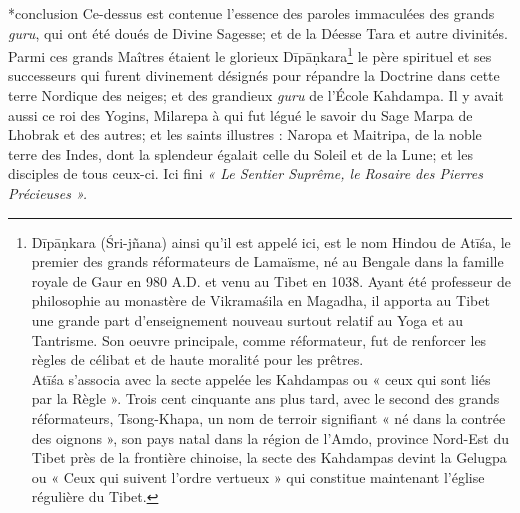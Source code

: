 \documentclass[10pt]{book}
\makeatletter
\renewcommand{\section}{\@startsection{section}{0}{0mm}
   {\baselineskip}
   {\baselineskip}{\normalfont\normalsize\scshape\centering}
}
\makeatother
\begin{document}
\section*{conclusion}
Ce-dessus est contenue l'essence des paroles immaculées des grands \textit{guru}, qui ont été doués de Divine Sagesse; et de la Déesse Tara et autre divinités. Parmi ces grands Maîtres étaient le glorieux Dīpāṇkara\footnote{Dīpāṇkara (Śri-jñana) ainsi qu'il est appelé ici, est le nom Hindou de Atīśa, le premier des grands réformateurs de Lamaïsme, né au Bengale dans la famille royale de Gaur en 980 A.D. et venu au Tibet en 1038. Ayant été professeur de philosophie au monastère de Vikramaśila en Magadha, il apporta au Tibet une grande part d'enseignement nouveau surtout relatif au Yoga et au Tantrisme. Son oeuvre principale, comme réformateur, fut de renforcer les règles de célibat et de haute moralité pour les prêtres.\\Atīśa s'associa avec la secte appelée les Kahdampas ou « ceux qui sont liés par la Règle ». Trois cent cinquante ans plus tard, avec le second des grands réformateurs, Tsong-Khapa, un nom de terroir signifiant « né dans la contrée des oignons », son pays natal dans la région de l'Amdo, province Nord-Est du Tibet près de la frontière chinoise, la secte des Kahdampas devint la Gelugpa ou « Ceux qui suivent l'ordre vertueux » qui constitue maintenant l'église régulière du Tibet.} le père spirituel et ses successeurs qui furent divinement désignés pour répandre la Doctrine dans cette terre Nordique des neiges; et des grandieux \textit{guru} de l'École Kahdampa. Il y avait aussi ce roi des Yogins, Milarepa à qui fut légué le savoir du Sage Marpa de Lhobrak et des autres; et les saints illustres : Naropa et Maitripa, de la noble terre des Indes, dont la splendeur égalait celle du Soleil et de la Lune; et les disciples de tous ceux-ci.
Ici fini \textit{«  Le Sentier Suprême, le Rosaire des Pierres Précieuses ».}
\end{document}
